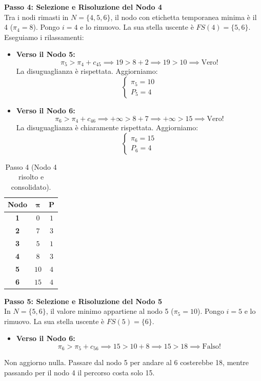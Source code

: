 \documentclass[12pt, a4paper]{article}
\begin{document}
	\textbf{Passo 4: Selezione e Risoluzione del Nodo 4}\\
	Tra i nodi rimasti in $N = \{4, 5, 6\}$, il nodo con etichetta temporanea minima è il 4 ($\pi_4 = 8$). Pongo $i = 4$ e lo rimuovo.
	La sua stella uscente è $FS(4) = \{5, 6\}$.
	Eseguiamo i rilassamenti:
	\begin{itemize}
		\item \textbf{Verso il Nodo 5:}
		\[
		\pi_5 > \pi_4 + c_{45} \implies 19 > 8 + 2 \implies 19 > 10 \implies \text{Vero!}
		\]
		La disuguaglianza è rispettata. Aggiorniamo:
		\[
		\begin{cases}
			\pi_5 = 10 \\
			P_5 = 4
		\end{cases}
		\]
		\item \textbf{Verso il Nodo 6:}
		\[
		\pi_6 > \pi_4 + c_{46} \implies +\infty > 8 + 7 \implies +\infty > 15 \implies \text{Vero!}
		\]
		La disuguaglianza è chiaramente rispettata. Aggiorniamo:
		\[
		\begin{cases}
			\pi_6 = 15 \\
			P_6 = 4
		\end{cases}
		\]
	\end{itemize}
	
	\begin{table}[H]
		\centering
		\begin{tabular}{|c|c|c|}
			\hline
			\textbf{Nodo} & $\boldsymbol{\pi}$ & $\mathbf{P}$ \\
			\hline
			\rowcolor{titlecolor!20} \textbf{1} & $0$ & $1$ \\
			\rowcolor{titlecolor!20} \textbf{2} & $7$ & $3$ \\
			\rowcolor{titlecolor!20} \textbf{3} & $5$ & $1$ \\
			\rowcolor{titlecolor!20} \textbf{4} & $8$ & $3$ \\
			\textbf{5} & $10$ & $4$ \\
			\textbf{6} & $15$ & $4$ \\
			\hline
		\end{tabular}
		\caption*{Passo 4 (Nodo 4 risolto e consolidato).}
	\end{table}
	
	\textbf{Passo 5: Selezione e Risoluzione del Nodo 5}\\
	In $N = \{5, 6\}$, il valore minimo appartiene al nodo 5 ($\pi_5 = 10$). Pongo $i = 5$ e lo rimuovo.
	La sua stella uscente è $FS(5) = \{6\}$.
	\begin{itemize}
		\item \textbf{Verso il Nodo 6:}
		\[
		\pi_6 > \pi_5 + c_{56} \implies 15 > 10 + 8 \implies 15 > 18 \implies \text{Falso!}
		\]
	\end{itemize}
	Non aggiorno nulla. Passare dal nodo 5 per andare al 6 costerebbe 18, mentre passando per il nodo 4 il percorso costa solo 15.
	
\end{document}
